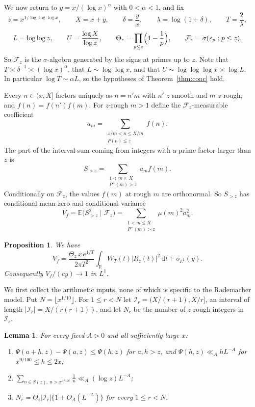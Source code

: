 \documentclass[11pt]{amsart}
\newtheorem{proposition}[theorem]{Proposition}
\newtheorem{lemma}[theorem]{Lemma}
\theoremstyle{remark}
\numberwithin{equation}{section}
\newcommand{\E}{\mathbb{E}}
\newcommand{\R}{\mathbb{R}}
\newcommand{\dd}{\,\mathrm{d}}
\begin{document}
We now return to $y=x/(\log x)^\alpha$ with $0<\alpha<1$, and fix
\[
z=x^{1/\log\log\log x},\qquad X=x+y,\qquad\delta=\frac yx,\qquad\lambda=\log(1+\delta),\qquad T=\frac2\lambda,
\]
\[
L=\log\log z,\qquad U=\frac{\log X}{\log z},\qquad\Theta_z=\prod_{p\le z}\Bigl(1-\frac1p\Bigr),\qquad\mathcal F_z=\sigma(\varepsilon_p:p\le z).
\]
So $\mathcal F_z$ is the $\sigma$-algebra generated by the signs at primes up to $z$. Note that $T\asymp\delta^{-1}\asymp(\log x)^\alpha$, that $L\sim\log\log x$, and that $U\sim\log\log\log x\asymp\log L$. In particular $\log T\sim\alpha L$, so the hypotheses of Theorem~\ref{thm:conc} hold.

Every $n\in(x,X]$ factors uniquely as $n=n'm$ with $n'$ $z$-smooth and $m$ $z$-rough, and $f(n)=f(n')f(m)$. For $z$-rough $m>1$ define the $\mathcal F_z$-measurable coefficient
\[
a_m=\sum_{\substack{x/m<n\le X/m\\ P(n)\le z}}f(n).
\]
The part of the interval sum coming from integers with a prime factor larger than $z$ is
\[
S_{>z}=\sum_{\substack{1<m\le X\\ P^-(m)>z}}a_mf(m).
\]
Conditionally on $\mathcal F_z$, the values $f(m)$ at rough $m$ are orthonormal. So $S_{>z}$ has conditional mean zero and conditional variance
\begin{equation}\label{eq:Vf}
V_f=\E\bigl(S_{>z}^2\mid\mathcal F_z\bigr)=\sum_{\substack{1<m\le X\\ P^-(m)>z}}\mu(m)^2a_m^2 .
\end{equation}

\begin{proposition}\label{prop:transfer}
We have
\begin{equation}\label{eq:transfer}
V_f=\frac{\Theta_z\,x\,e^{1/T}}{2\pi T^2}\int_\R W_T(t)|R_z(t)|^2\dd t+o_{L^1}(y).
\end{equation}
Consequently $V_f/(cy)\to1$ in $L^1$.
\end{proposition}

We first collect the arithmetic inputs, none of which is specific to the Rademacher model. Put $N=\lfloor x^{1/10}\rfloor$. For $1\le r<N$ let $\mathcal I_r=(X/(r+1),X/r]$, an interval of length $|\mathcal I_r|=X/(r(r+1))$, and let $N_r$ be the number of $z$-rough integers in $\mathcal I_r$.

\begin{lemma}\label{lem:arith}
For every fixed $A>0$ and all sufficiently large $x$:
\begin{enumerate}[label=\textup{(\alph*)}]
\item $\Psi(a+h,z)-\Psi(a,z)\le\Psi(h,z)$ for $a,h>z$, and $\Psi(h,z)\ll_AhL^{-A}$ for $x^{9/100}\le h\le2x$;
\item $\displaystyle\sum_{n\in S(z),\ n>x^{9/100}}\frac1n\ll_A(\log z)L^{-A}$;
\item $N_r=\Theta_z|\mathcal I_r|\{1+O_A(L^{-A})\}$ for every $1\le r<N$.
\end{enumerate}
\end{lemma}
\end{document}
